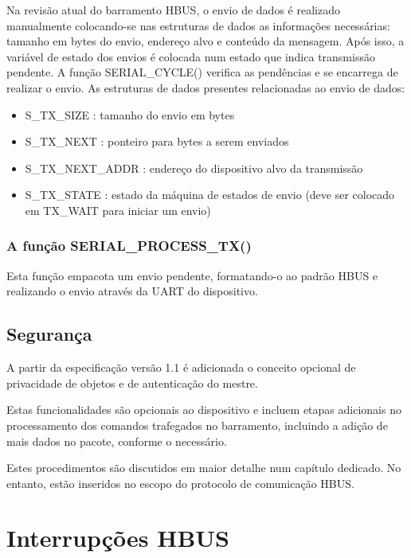 \documentclass[11pt]{report}
\begin{document}
Na revisão atual do barramento HBUS, o envio de dados é realizado manualmente colocando-se nas estruturas de dados as informações necessárias: tamanho em bytes do envio, endereço alvo e conteúdo da mensagem. Após isso, a variável de estado dos envios é colocada num estado que indica transmissão pendente. A função SERIAL\_CYCLE() verifica as pendências e se encarrega de realizar o envio. As estruturas de dados presentes relacionadas ao envio de dados:

\begin{itemize}

\item S\_TX\_SIZE : tamanho do envio em bytes
\item S\_TX\_NEXT : ponteiro para bytes a serem enviados
\item S\_TX\_NEXT\_ADDR : endereço do dispositivo alvo da transmissão
\item S\_TX\_STATE : estado da máquina de estados de envio (deve ser colocado em TX\_WAIT para iniciar um envio)

\end{itemize}

\subsection{A função SERIAL\_PROCESS\_TX()}

Esta função empacota um envio pendente, formatando-o ao padrão HBUS e realizando o envio através da UART do dispositivo.

\section{Segurança}

A partir da especificação versão 1.1 é adicionada o conceito opcional de privacidade de objetos e de autenticação do mestre.

Estas funcionalidades são opcionais ao dispositivo e incluem etapas adicionais no processamento dos comandos trafegados no barramento, incluindo a adição de mais dados no pacote, conforme o necessário.

Estes procedimentos são discutidos em maior detalhe num capítulo dedicado. No entanto, estão inseridos no escopo do protocolo de comunicação HBUS.

\chapter{Interrupções HBUS}
\end{document}
